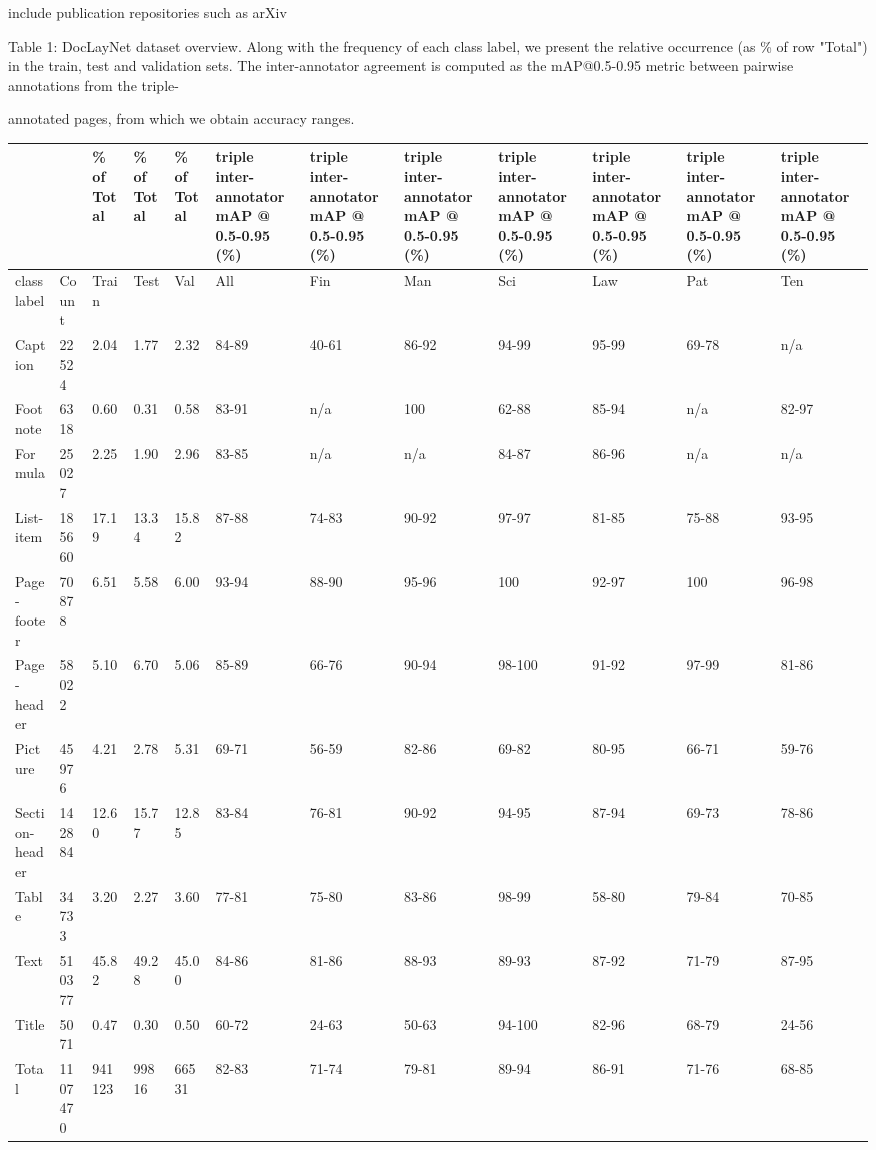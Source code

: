 include publication repositories such as arXiv

Table 1: DocLayNet dataset overview. Along with the frequency of each class label, we present the relative occurrence (as \% of row "Total") in the train, test and validation sets. The inter-annotator agreement is computed as the mAP@0.5-0.95 metric between pairwise annotations from the triple-

annotated pages, from which we obtain accuracy ranges.

\begin{figure}[h]
\end{figure}

\begin{table}[h]
\begin{tabular}{|l|l|l|l|l|l|l|l|l|l|l|l|}
\hline
 &  & \% of Total & \% of Total & \% of Total & triple inter- annotator mAP @ 0.5-0.95 (\%) & triple inter- annotator mAP @ 0.5-0.95 (\%) & triple inter- annotator mAP @ 0.5-0.95 (\%) & triple inter- annotator mAP @ 0.5-0.95 (\%) & triple inter- annotator mAP @ 0.5-0.95 (\%) & triple inter- annotator mAP @ 0.5-0.95 (\%) & triple inter- annotator mAP @ 0.5-0.95 (\%) \\ \hline
class label & Count & Train & Test & Val & All & Fin & Man & Sci & Law & Pat & Ten \\ \hline
Caption & 22524 & 2.04 & 1.77 & 2.32 & 84-89 & 40-61 & 86-92 & 94-99 & 95-99 & 69-78 & n/a \\ \hline
Footnote & 6318 & 0.60 & 0.31 & 0.58 & 83-91 & n/a & 100 & 62-88 & 85-94 & n/a & 82-97 \\ \hline
Formula & 25027 & 2.25 & 1.90 & 2.96 & 83-85 & n/a & n/a & 84-87 & 86-96 & n/a & n/a \\ \hline
List-item & 185660 & 17.19 & 13.34 & 15.82 & 87-88 & 74-83 & 90-92 & 97-97 & 81-85 & 75-88 & 93-95 \\ \hline
Page- footer & 70878 & 6.51 & 5.58 & 6.00 & 93-94 & 88-90 & 95-96 & 100 & 92-97 & 100 & 96-98 \\ \hline
Page- header & 58022 & 5.10 & 6.70 & 5.06 & 85-89 & 66-76 & 90-94 & 98-100 & 91-92 & 97-99 & 81-86 \\ \hline
Picture & 45976 & 4.21 & 2.78 & 5.31 & 69-71 & 56-59 & 82-86 & 69-82 & 80-95 & 66-71 & 59-76 \\ \hline
Section- header & 142884 & 12.60 & 15.77 & 12.85 & 83-84 & 76-81 & 90-92 & 94-95 & 87-94 & 69-73 & 78-86 \\ \hline
Table & 34733 & 3.20 & 2.27 & 3.60 & 77-81 & 75-80 & 83-86 & 98-99 & 58-80 & 79-84 & 70-85 \\ \hline
Text & 510377 & 45.82 & 49.28 & 45.00 & 84-86 & 81-86 & 88-93 & 89-93 & 87-92 & 71-79 & 87-95 \\ \hline
Title & 5071 & 0.47 & 0.30 & 0.50 & 60-72 & 24-63 & 50-63 & 94-100 & 82-96 & 68-79 & 24-56 \\ \hline
Total & 1107470 & 941123 & 99816 & 66531 & 82-83 & 71-74 & 79-81 & 89-94 & 86-91 & 71-76 & 68-85 \\ \hline
\end{tabular}
\end{table}

